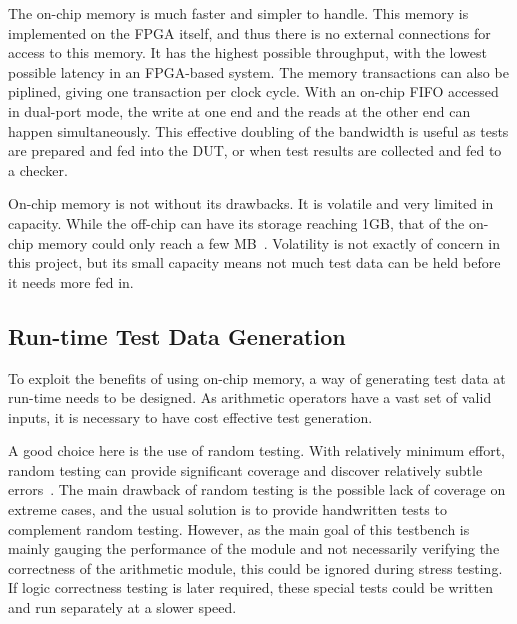 The on-chip memory is much faster and simpler to handle.
This memory is implemented on the FPGA itself, and thus there is no external
connections for access to this memory.
It has the highest possible throughput, with the lowest possible latency
in an FPGA-based system.
The memory transactions can also be piplined, giving one transaction per
clock cycle.
With an on-chip FIFO accessed in dual-port mode, the write at one end and the
reads at the other end can happen simultaneously.
This effective doubling of the bandwidth is useful as tests are prepared
and fed into the DUT, or when test results are collected and fed to a checker.

On-chip memory is not without its drawbacks.
It is volatile and very limited in capacity.
While the off-chip can have its storage reaching 1GB, that of the on-chip
memory could only reach a few MB~\cite{Altera2}.
Volatility is not exactly of concern in this project, but its small capacity
means not much test data can be held before it needs more fed in.


\subsection{Run-time Test Data Generation}
To exploit the benefits of using on-chip memory, a way of generating test data
at run-time needs to be designed.
As arithmetic operators have a vast set of valid inputs, it is necessary to
have cost effective test generation.

A good choice here is the use of random testing.
With relatively minimum effort, random testing can provide significant coverage
and discover relatively subtle errors~\cite{Duran1}.
The main drawback of random testing is the possible lack of coverage on extreme
cases, and the usual solution is to provide handwritten tests to complement
random testing.
However, as the main goal of this testbench is mainly gauging the performance of
the module and not necessarily verifying the correctness of the arithmetic
module, this could be ignored during stress testing.
If logic correctness testing is later required, these special tests could be
written and run separately at a slower speed.

